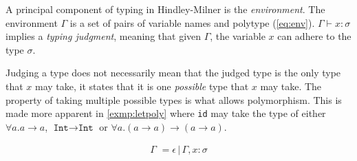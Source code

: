 \documentclass[11pt,oneside,a4paper]{report}
\begin{document}
A principal component of typing in Hindley-Milner is the \textit{environment}.
The environment $\Gamma$ is a set of pairs of variable names and polytype (\autoref{eq:env}).
$\Gamma \vdash x: \sigma$ implies a \textit{typing judgment}, meaning that given $\Gamma$, the variable $x$ can adhere to the type $\sigma$.
\begin{remark}
    \label{remark:judgpoly}
    Judging a type does not necessarily mean that the judged type is the only type that $x$ may take, it states that it is one \textit{possible} type that $x$ may take.
    The property of taking multiple possible types is what allows polymorphism.
    This is made more apparent in \autoref{exmp:letpoly} where \texttt{id} may take the type of either $\forall a . a \rightarrow a$, $\texttt{Int} \rightarrow \texttt{Int}$ or $\forall a . (a \rightarrow a) \rightarrow (a \rightarrow a)$.
\end{remark}
\begin{align}
	\Gamma \,\, = \epsilon \,|\, \Gamma, x : \sigma
	\label{eq:env}
\end{align}
\end{document}
